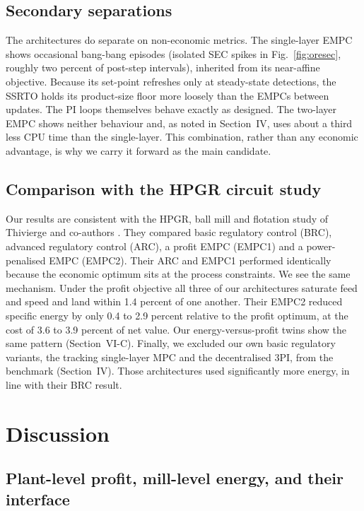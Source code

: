 \documentclass[conference]{IEEEtran}
\begin{document}
\subsection{Secondary separations}

The architectures do separate on non-economic metrics. The single-layer
EMPC shows occasional bang-bang episodes (isolated SEC spikes in
Fig.~\ref{fig:oresec}, roughly two percent of post-step intervals),
inherited from its near-affine objective. Because its set-point refreshes only
at steady-state detections, the SSRTO holds its product-size floor more
loosely than the EMPCs between updates. The PI loops themselves behave
exactly as designed. The two-layer EMPC shows neither behaviour and, as
noted in Section~IV, uses about a third less CPU time than the
single-layer. This combination, rather than any economic advantage, is
why we carry it forward as the main candidate.

\subsection{Comparison with the HPGR circuit study}

Our results are consistent with the HPGR, ball mill and flotation study
of Thivierge and co-authors \cite{thivierge2023}. They compared basic
regulatory control (BRC), advanced regulatory control (ARC), a profit
EMPC (EMPC1) and a power-penalised EMPC (EMPC2). Their ARC and EMPC1
performed identically because the economic optimum sits at the process
constraints. We see the same mechanism. Under the profit objective all
three of our architectures saturate feed and speed and land within 1.4
percent of one another. Their EMPC2 reduced specific energy by only 0.4
to 2.9 percent relative to the profit optimum, at the cost of 3.6 to
3.9 percent of net value. Our energy-versus-profit twins show the same
pattern (Section~VI-C). Finally, we excluded our own basic regulatory
variants, the tracking single-layer MPC and the decentralised 3PI, from
the benchmark (Section~IV). Those architectures used significantly more
energy, in line with their BRC result.

\section{Discussion}

\subsection{Plant-level profit, mill-level energy, and their interface}
\end{document}
